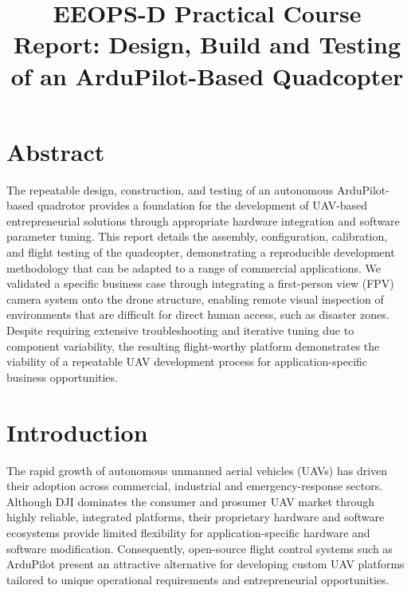\documentclass[conference]{IEEEtran}
\begin{document}
\title{EEOPS-D Practical Course Report: Design, Build and Testing of an
ArduPilot-Based Quadcopter}

\author{
}

\maketitle
\thispagestyle{fancy}
\pagestyle{fancy}
\fancyhf{}              %
\fancyfoot[C]{\thepage} %
\renewcommand{\headrulewidth}{0pt}
\renewcommand{\footrulewidth}{0pt}

\tableofcontents
\thispagestyle{plain}

\section{Abstract}
The repeatable design, construction, and testing of an autonomous ArduPilot-based quadrotor provides a foundation for the development of UAV-based entrepreneurial solutions through appropriate hardware integration and software parameter tuning. This report details the assembly, configuration, calibration, and flight testing of the quadcopter, demonstrating a reproducible development methodology that can be adapted to a range of commercial applications. We validated a specific business case through integrating a first-person view (FPV) camera system onto the drone structure, enabling remote visual inspection of environments that are difficult for direct human access, such as disaster zones. Despite requiring extensive troubleshooting and iterative tuning due to component variability, the resulting flight-worthy platform demonstrates the viability of a repeatable UAV development process for application-specific business opportunities.


\section{Introduction}
The rapid growth of autonomous unmanned aerial vehicles (UAVs) has driven their adoption across commercial, industrial and emergency-response sectors. Although DJI dominates the consumer and prosumer UAV market through highly reliable, integrated platforms, their proprietary hardware and software ecosystems provide limited flexibility for application-specific hardware and software modification. Consequently, open-source flight control systems such as ArduPilot present an attractive alternative for developing custom UAV platforms tailored to unique operational requirements and entrepreneurial opportunities.
\end{document}
